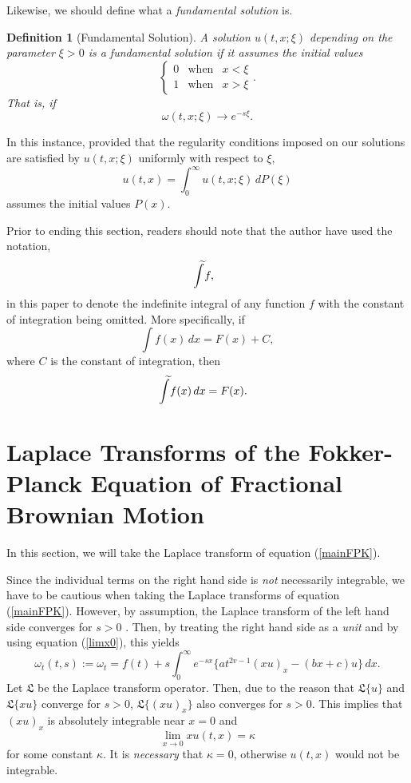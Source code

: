 \documentclass[preprint, 12pt]{elsarticle}
\numberwithin{equation}{section}
\theoremstyle{plain}
\newtheorem{definition}{Definition}[section]
\theoremstyle{remark}
\newcommand{\assign}{:=}
\begin{document}
Likewise, we should define what a \textit{fundamental solution} is.

\begin{definition}[Fundamental Solution]
A solution $u (t, x ; \xi)$ depending on the parameter $\xi > 0$ is a fundamental solution if it assumes the initial values
\[ \left\{ \begin{array}{lll}
     0 & \text{when} & x < \xi\\
     1 & \text{when} & x > \xi
   \end{array} \right.. \]
That is, if
\[ \omega (t, x ; \xi) \rightarrow e^{- s \xi} . \]
\end{definition}

In this instance, provided that the regularity conditions imposed on
our solutions are satisfied by $u (t, x ; \xi)$ uniformly with respect to $\xi$,
\[ u (t, x) = \int_0^{\infty} u (t, x ; \xi)\, d P (\xi) \]
assumes the initial values $P (x)$.

Prior to ending this section, readers should note that the author have used the notation,
\[\widetilde{\kern-7pt\int}{f},\]
in this paper to denote the indefinite integral of any function $f$ with the constant of integration being omitted. More specifically, if 
\[\int{f(x)\,dx} = F(x) + C,\]
where $C$ is the constant of integration, then
\[\widetilde{\kern-7pt\int}{f(x)\,dx} = F(x).\]

\section{Laplace Transforms of the Fokker-Planck Equation of Fractional Brownian Motion}\label{derivation}

In this section, we will take the Laplace transform of equation (\ref{mainFPK}).

Since the individual terms on the right hand side is {\emph{not}} necessarily integrable, we have to be cautious when taking the Laplace transforms of equation (\ref{mainFPK}). However, by assumption, the Laplace transform of the left hand side converges for $s > 0$ \citep{Feller}. Then, by treating the right hand side as a {\emph{unit}} and by using equation (\ref{limx0}), this yields
\begin{equation}
\omega_t(t,s) \assign \omega_t = f (t) + s \int_0^{\infty} e^{- s x}  \{ a t^{2 v - 1}  (x u)_x - (b x + c) u \}\, d x \label{Lpmain}.
\end{equation}
Let $\mathfrak{L}$ be the Laplace transform operator. Then, due to the reason that $\mathfrak{L}\{u\}$ and $\mathfrak{L}\{x u\}$ converge for $s > 0$, $\mathfrak{L}\{(x u)_x\}$ also converges for $s > 0$. This implies that $(x u)_x$ is absolutely integrable near $x = 0$ and
\[ \lim_{x \rightarrow 0} x u (t, x) = \kappa \]
for some constant $\kappa$. It is {\emph{necessary}} that $\kappa = 0$, otherwise $u (t, x)$ would not be integrable.
\end{document}
